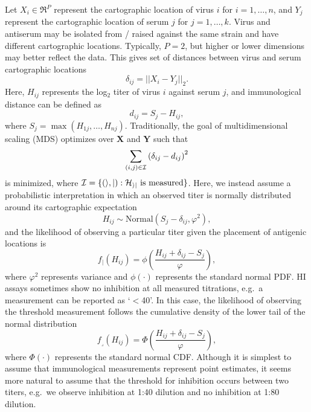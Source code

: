 \documentclass[11pt,oneside,letterpaper]{article}
\newcommand{\point}{f_{\scriptscriptstyle \vert}}	%
\newcommand{\threshold}{f_{\textstyle \lrcorner}}	%
\newcommand{\mdssd}{\varphi}						%
\newcommand{\vn}{n}									%
\newcommand{\sn}{k}									%
\begin{document}
Let $X_i \in \Re^{P}$ represent the cartographic location of virus $i$ for $i = 1,\ldots,\vn$, and $Y_j$ represent the cartographic location of serum $j$ for $j = 1,\ldots,\sn$.
Virus and antiserum may be isolated from / raised against the same strain and have different cartographic locations.
Typically, $P = 2$, but higher or lower dimensions may better reflect the data.  
This gives set of distances between virus and serum cartographic locations 
\begin{equation}
	\delta_{ij} =  || X_i - Y_j ||_2.
\end{equation}
Here, $H_{ij}$ represents the log$_2$ titer of virus $i$ against serum $j$, and immunological distance can be defined as
\begin{equation}
	d_{ij} =  S_j - H_{ij},
\end{equation}
where $S_j = \max ( H_{1j},\ldots,H_{\vn j} )$.
Traditionally, the goal of multidimensional scaling (MDS) optimizes over $\mathbf{X}$ and $\mathbf{Y}$ such that
\begin{equation}
	\sum_{(i,j) \in \cal I} 
	\left(
		\delta_{ij} - d_{ij}
	\right)^2
\end{equation}
is minimized, where $\cal I = \{ (i,j) : H_{ij} \mbox{ is measured} \}$. 
Here, we instead assume a probabilistic interpretation in which an observed titer is normally distributed around its cartographic expectation
\begin{equation} 
	H_{ij} \sim \mbox{Normal}( S_j - \delta_{ij}, \mdssd^2 ),
\end{equation}
and the likelihood of observing a particular titer given the placement of antigenic locations is 
\begin{equation} 
	\point(H_{ij}) = \phi \left( \frac{ H_{ij} + \delta_{ij} - S_j }{ \mdssd } \right),
\end{equation}
where $\mdssd^2$ represents variance and $\phi(\cdot)$ represents the standard normal PDF.
HI assays sometimes show no inhibition at all measured titrations, e.g.\ a measurement can be reported as `$<$40'.
In this case, the likelihood of observing the threshold measurement follows the cumulative density of the lower tail of the normal distribution
\begin{equation} 
	\threshold(H_{ij}) = \Phi \left( \frac{ H_{ij} + \delta_{ij} - S_j }{ \mdssd } \right),
\end{equation}
where $\Phi(\cdot)$ represents the standard normal CDF.
Although it is simplest to assume that immunological measurements represent point estimates, it seems more natural to assume that the threshold for inhibition occurs between two titers, e.g.\ we observe inhibition at 1:40 dilution and no inhibition at 1:80 dilution.
\end{document}
